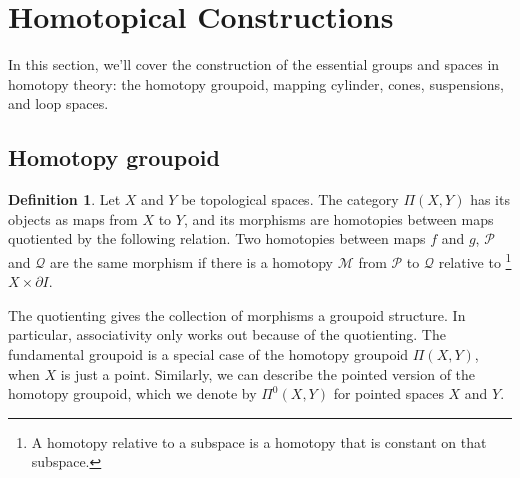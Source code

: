 \documentclass[12pt, notitlepage]{article}
\theoremstyle{definition}
\newtheorem{defn}{Definition}[section]
\begin{document}
\section{Homotopical Constructions}
In this section, we'll cover the construction of the essential groups and spaces in homotopy theory:
the homotopy groupoid, mapping cylinder, cones, suspensions, and loop spaces.

\subsection{Homotopy groupoid}
\begin{defn}
  Let $X$ and $Y$ be topological spaces. The category $\Pi(X,Y)$ has its objects as maps from $X$ to
  $Y$, and its morphisms are homotopies between maps quotiented by the following relation. Two
  homotopies between maps $f$ and $g$, $\mathcal{P}$ and $\mathcal{Q}$ are the same morphism if
  there is a homotopy $\mathcal{M}$ from $\mathcal{P}$ to $\mathcal{Q}$ relative to \footnote{A
    homotopy relative to a subspace is a homotopy that is constant on that subspace.}
  $X \times \partial I$.
\end{defn}
The quotienting gives the collection of morphisms a groupoid structure. In particular, associativity
only works out because of the quotienting. The fundamental groupoid is a special case of the
homotopy groupoid $\Pi(X,Y)$, when $X$ is just a point. Similarly, we can describe the pointed
version of the homotopy groupoid, which we denote by $\Pi^0(X,Y)$ for pointed spaces $X$ and $Y$.
\end{document}
